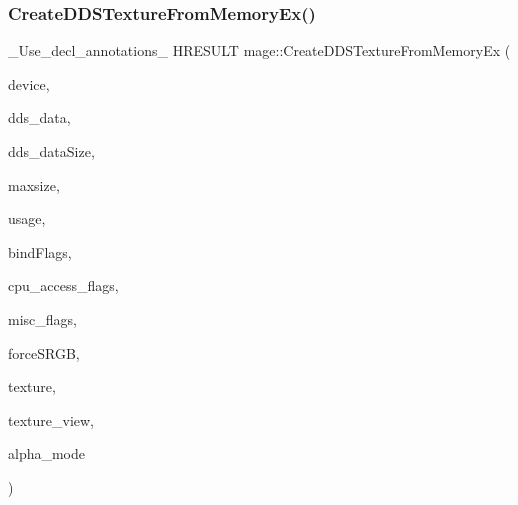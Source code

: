 \subsubsection{\texorpdfstring{Create\+D\+D\+S\+Texture\+From\+Memory\+Ex()}{CreateDDSTextureFromMemoryEx()}\hspace{0.1cm}{\footnotesize\ttfamily [3/4]}}
{\footnotesize\ttfamily \+\_\+\+Use\+\_\+decl\+\_\+annotations\+\_\+ H\+R\+E\+S\+U\+LT mage\+::\+Create\+D\+D\+S\+Texture\+From\+Memory\+Ex (\begin{DoxyParamCaption}\item[{\hyperlink{namespacemage_ae74f374780900893caa5555d1031fd79}{Com\+Ptr}$<$ I\+D3\+D11\+Device2 $>$}]{device,  }\item[{const uint8\+\_\+t $\ast$}]{dds\+\_\+data,  }\item[{size\+\_\+t}]{dds\+\_\+data\+Size,  }\item[{size\+\_\+t}]{maxsize,  }\item[{D3\+D11\+\_\+\+U\+S\+A\+GE}]{usage,  }\item[{uint32\+\_\+t}]{bind\+Flags,  }\item[{uint32\+\_\+t}]{cpu\+\_\+access\+\_\+flags,  }\item[{uint32\+\_\+t}]{misc\+\_\+flags,  }\item[{bool}]{force\+S\+R\+GB,  }\item[{I\+D3\+D11\+Resource $\ast$$\ast$}]{texture,  }\item[{I\+D3\+D11\+Shader\+Resource\+View $\ast$$\ast$}]{texture\+\_\+view,  }\item[{\hyperlink{namespacemage_a0c586a2bad862f4858900ca121ca80c2}{D\+D\+S\+\_\+\+A\+L\+P\+H\+A\+\_\+\+M\+O\+DE} $\ast$}]{alpha\+\_\+mode }\end{DoxyParamCaption})}

\hypertarget{namespacemage_a4d8418e49c8d4b5818c1ca7f36bb7a3b}{}\label{namespacemage_a4d8418e49c8d4b5818c1ca7f36bb7a3b} 
